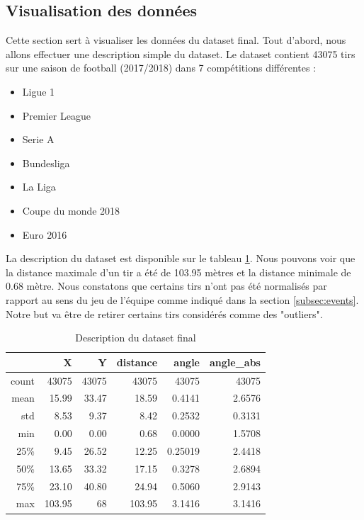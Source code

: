 \documentclass[12pt]{article}
\begin{document}
\subsection{Visualisation des données}
Cette section sert à visualiser les données du dataset final.
Tout d'abord, nous allons effectuer une description simple du dataset.
Le dataset contient 43075 tirs sur une saison de football (2017/2018) dans 7 compétitions différentes :
\begin{itemize}
    \item Ligue 1
    \item Premier League
    \item Serie A
    \item Bundesliga
    \item La Liga
    \item Coupe du monde 2018
    \item Euro 2016
\end{itemize}
La description du dataset est disponible sur le tableau \ref{tab:describe_dataset}.
Nous pouvons voir que la distance maximale d'un tir a été de 103.95 mètres et la distance minimale de 0.68 mètre.
Nous constatons que certains tirs n'ont pas été normalisés par rapport au sens du jeu de l'équipe comme indiqué dans la section \ref{subsec:events}. 
Notre but va être de retirer certains tirs considérés comme des "outliers".
\begin{table}[htp]
    \centering
    \begin{tabular}{r|r|r|r|r|r|}
        \cline{2-6}
        \textbf{}                   & \textbf{X}   & \textbf{Y}   & \textbf{distance} & \textbf{angle} & \textbf{angle\_abs} \\ \hline
        \multicolumn{1}{|r|}{count} & 43075 & 43075 & 43075      & 43075   & 43075        \\ \hline
        \multicolumn{1}{|r|}{mean}  & 15.99    & 33.47    & 18.59         & 0.4141       & 2.6576            \\ \hline
        \multicolumn{1}{|r|}{std}   & 8.53     & 9.37     & 8.42          & 0.2532       & 0.3131            \\ \hline
        \multicolumn{1}{|r|}{min}   & 0.00     & 0.00     & 0.68          & 0.0000       & 1.5708            \\ \hline
        \multicolumn{1}{|r|}{25\%}  & 9.45     & 26.52    & 12.25         & 0.25019       & 2.4418            \\ \hline
        \multicolumn{1}{|r|}{50\%}  & 13.65    & 33.32    & 17.15         & 0.3278       & 2.6894            \\ \hline
        \multicolumn{1}{|r|}{75\%}  & 23.10   & 40.80    & 24.94         & 0.5060       & 2.9143            \\ \hline
        \multicolumn{1}{|r|}{max}   & 103.95   & 68    & 103.95        & 3.1416       & 3.1416            \\ \hline
        \end{tabular}
    \caption{Description du dataset final}
    \label{tab:describe_dataset}
\end{table}
\end{document}
